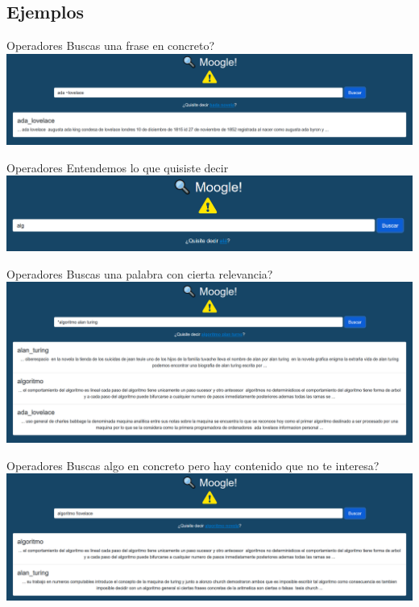 \documentclass{beamer}
\begin{document}
\subsection{Ejemplos}

\begin{frame}{Operadores}
   Buscas una frase en concreto?\\
    \includegraphics[scale=0.2]{Imagenes/operator_near.png}
\end{frame}

\begin{frame}{Operadores}
    Entendemos lo que quisiste decir\\
    \bigskip
    \includegraphics[scale=0.2]{Imagenes/suggestion.png}
\end{frame}

\begin{frame}{Operadores}
    Buscas una palabra con cierta relevancia?\\
    \includegraphics[scale=0.2]{Imagenes/operator_importance.png}
\end{frame}

\begin{frame}{Operadores}
    Buscas algo en concreto pero hay contenido que no te interesa?\\
    \includegraphics[scale=0.2]{Imagenes/operator_none.png}
\end{frame}
\end{document}
